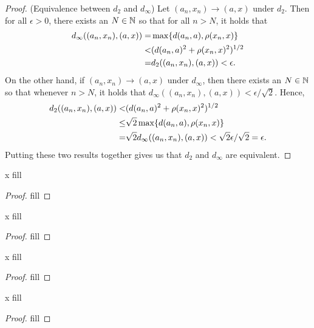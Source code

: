 \begin{proof}
(Equivalence between $d_2$ and $d_\infty$) Let $(a_n,x_n)\to (a,x)$ under $d_2$. Then for all $\epsilon>0$, there exists an $N\in\mathbb{N}$ so that for all $n>N$, it holds that 
\begin{align*}
    d_\infty((a_n,x_n),(a,x)) 
    =& \max\{d(a_n,a),\rho(x_n,x)\}\\
    <& (d(a_n,a)^2+\rho(x_n,x)^2)^{1/2}\\
    =& d_2((a_n,x_n),(a,x)) <\epsilon.
\end{align*}
On the other hand, if $(a_n,x_n)\to (a,x)$ under $d_\infty$, then there exists an $N\in\mathbb{N}$ so that whenever $n>N$, it holds that $d_\infty((a_n,x_n),(a,x)) <\epsilon/\sqrt{2}$. Hence,
\begin{align*}
    d_2((a_n,x_n),(a,x)) 
    <& (d(a_n,a)^2+\rho(x_n,x)^2)^{1/2}\\
    \leq& \sqrt{2}\max\{d(a_n,a),\rho(x_n,x)\}\\
    =& \sqrt{2}d_\infty((a_n,x_n),(a,x)) <\sqrt{2}\epsilon/\sqrt{2} = \epsilon.
\end{align*}
Putting these two results together gives us that $d_2$ and $d_\infty$ are equivalent.
\end{proof} 



\begin{exercise}{x}
fill
\end{exercise}
\begin{proof}
fill
\end{proof} 

\begin{exercise}{x}
fill
\end{exercise}
\begin{proof}
fill
\end{proof} 

\begin{exercise}{x}
fill
\end{exercise}
\begin{proof}
fill
\end{proof} 

\begin{exercise}{x}
fill
\end{exercise}
\begin{proof}
fill
\end{proof} 